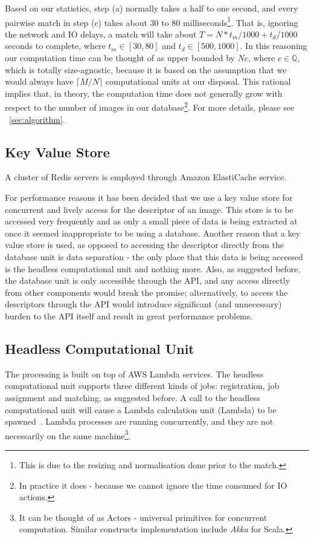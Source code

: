 Based on our statistics, step (a) normally takes a half to one second, and every pairwise match in step (c) takes about 30 to 80 milliseconds\footnote{This is due to the resizing and normalisation done prior to the match.}. That is, ignoring the network and IO delays, a match will take about $T = N * t_m / 1000 + t_d / 1000$ seconds to complete, where $t_m \in [30, 80]$ and $t_d \in [500, 1000]$. In this reasoning our computation time can be thought of as upper bounded by $Nc$, where $c \in \mathbb{Q}$, which is totally size-agnostic, because it is based on the assumption that we would always have $\lceil M / N \rceil$ computational units at our disposal. This rational implies that, in theory, the computation time does not generally grow with respect to the number of images in our database\footnote{In practice it does - because we cannot ignore the time consumed for IO actions.}. For more details, please see ~\ref{sec:algorithm}.

\subsection{Key Value Store}
A cluster of Redis servers is employed through Amazon ElastiCache service.

For performance reasons it has been decided that we use a key value store for concurrent and lively access for the descriptor of an image. This store is to be accessed very frequently and as only a small piece of data is being extracted at once it seemed inappropriate to be using a database. Another reason that a key value store is used, as opposed to accessing the descriptor directly from the database unit is data separation - the only place that this data is being accessed is the headless computational unit and nothing more. Also, as suggested before, the database unit is only accessible through the API, and any access directly from other components would break the promise; alternatively, to access the descriptors through the API would introduce significant (and unnecessary) burden to the API itself and result in great performance problems.

\subsection{Headless Computational Unit}
\label{sec:lambda}
The processing is built on top of AWS Lambda services. The headless computational unit supports three different kinds of jobs: registration, job assignment and matching, as suggested before. A call to the headless computational unit will cause a Lambda calculation unit (Lambda) to be spawned~\cite{lambda}. Lambda processes are running concurrently, and they are not necessarily on the same machine\footnote{It can be thought of as Actors - universal primitives for concurrent computation. Similar constructs implementation include \textit{Akka} for Scala.}.

